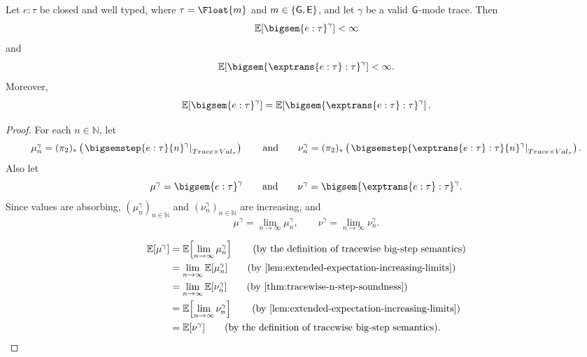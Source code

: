 \begin{theorem}
  \label{thm:tracewise-big-step-soundness}
  Let $e:\tau$ be closed and well typed, where
  $\tau=\Float{m}$ and $m\in\{\mathsf{G},\mathsf{E}\}$, and let $\gamma$ be a valid
  $\mathsf{G}$-mode trace.
  Then
  \[
    \mathbb E\!\left[
      \bigsem{e:\tau}^{\gamma}
    \right]
    <
    \infty
  \]
  and
  \[
    \mathbb E\!\left[
      \bigsem{\exptrans{e:\tau}:\tau}^{\gamma}
    \right]
    <
    \infty.
  \]
  Moreover,
  \[
    \mathbb E\!\left[
      \bigsem{e:\tau}^{\gamma}
    \right]
    =
    \mathbb E\!\left[
      \bigsem{\exptrans{e:\tau}:\tau}^{\gamma}
    \right].
  \]
\end{theorem}


\begin{proof}
  For each $n\in\mathbb N$, let
  \[
    \mu_n^\gamma
    =
    (\pi_2)_*
    \left(
      \left.\bigsemstep{e:\tau}{n}^{\gamma}
      \right|_{Trace\times Val_\tau}
    \right)
    \qquad\text{and}\qquad
    \nu_n^\gamma
    =
    (\pi_2)_*
    \left(
      \left.\bigsemstep{\exptrans{e:\tau}:\tau}{n}^{\gamma}
      \right|_{Trace\times Val_\tau}
    \right).
  \]
  Also let
  \[
    \mu^\gamma
    =
    \bigsem{e:\tau}^{\gamma}
    \qquad\text{and}\qquad
    \nu^\gamma
    =
    \bigsem{\exptrans{e:\tau}:\tau}^{\gamma}.
  \]
  Since values are absorbing, $(\mu_n^\gamma)_{n\in\mathbb N}$ and
  $(\nu_n^\gamma)_{n\in\mathbb N}$ are increasing, and
  \[
    \mu^\gamma=\lim_{n\to\infty}\mu_n^\gamma,
    \qquad
    \nu^\gamma=\lim_{n\to\infty}\nu_n^\gamma.
  \]

  \begin{align}
    \mathbb E[\mu^\gamma]
    &=
    \mathbb E\!\left[
      \lim_{n\to\infty}\mu_n^\gamma
    \right]
    \tag{\text{by the definition of tracewise big-step semantics}}
    \\
    &=
    \lim_{n\to\infty}\mathbb E[\mu_n^\gamma]
    \tag{\text{by \Cref{lem:extended-expectation-increasing-limits}}}
    \\
    &=
    \lim_{n\to\infty}\mathbb E[\nu_n^\gamma]
    \tag{\text{by \Cref{thm:tracewise-n-step-soundness}}}
    \\
    &=
    \mathbb E\!\left[
      \lim_{n\to\infty}\nu_n^\gamma
    \right]
    \tag{\text{by \Cref{lem:extended-expectation-increasing-limits}}}
    \\
    &=
    \mathbb E[\nu^\gamma]
    \tag{\text{by the definition of tracewise big-step semantics}}.
  \end{align}
\end{proof}

